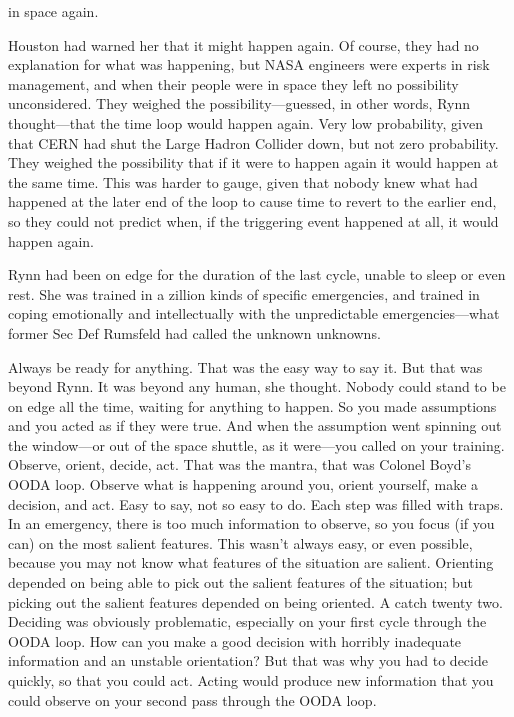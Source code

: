  in space again.

Houston had warned her that it might happen again. Of course, they had no explanation for what was happening, but NASA engineers were experts in risk management, and when their people were in space they left no possibility unconsidered. They weighed the possibility---guessed, in other words, Rynn thought---that the time loop would happen again. Very low probability, given that CERN had shut the Large Hadron Collider down, but not zero probability. They weighed the possibility that if it were to happen again it would happen at the same time. This was harder to gauge, given that nobody knew what had happened at the later end of the loop to cause time to revert to the earlier end, so they could not predict when, if the triggering event happened at all, it would happen again.

Rynn had been on edge for the duration of the last cycle, unable to sleep or even rest. She was trained in a zillion kinds of specific emergencies, and trained in coping emotionally and intellectually with the unpredictable emergencies---what former Sec Def Rumsfeld had called the unknown unknowns.

Always be ready for anything. That was the easy way to say it. But that was beyond Rynn. It was beyond any human, she thought. Nobody could stand to be on edge all the time, waiting for anything to happen. So you made assumptions and you acted as if they were true. And when the assumption went spinning out the window---or out of the space shuttle, as it were---you called on your training. Observe, orient, decide, act. That was the mantra, that was Colonel Boyd's OODA loop. Observe what is happening around you, orient yourself, make a decision, and act. Easy to say, not so easy to do. Each step was filled with traps. In an emergency, there is too much information to observe, so you focus (if you can) on the most salient features. This wasn't always easy, or even possible, because you may not know what features of the situation are salient. Orienting depended on being able to pick out the salient features of the situation; but picking out the salient features depended on being oriented. A catch twenty two. Deciding was obviously problematic, especially on your first cycle through the OODA loop. How can you make a good decision with horribly inadequate information and an unstable orientation? But that was why you had to decide quickly, so that you could act. Acting would produce new information that you could observe on your second pass through the OODA loop.

